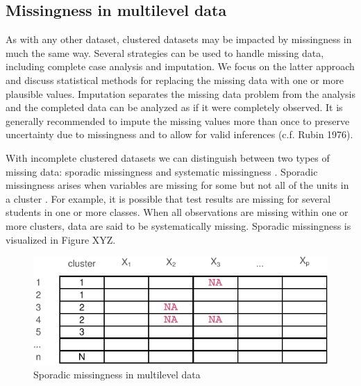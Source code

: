 \documentclass[
]{jss}
\begin{document}
\hypertarget{missingness-in-multilevel-data}{%
\subsection{Missingness in multilevel
data}\label{missingness-in-multilevel-data}}

As with any other dataset, clustered datasets may be impacted by
missingness in much the same way. Several strategies can be used to
handle missing data, including complete case analysis and imputation. We
focus on the latter approach and discuss statistical methods for
replacing the missing data with one or more plausible values. Imputation
separates the missing data problem from the analysis and the completed
data can be analyzed as if it were completely observed. It is generally
recommended to impute the missing values more than once to preserve
uncertainty due to missingness and to allow for valid inferences (c.f.
Rubin 1976).

With incomplete clustered datasets we can distinguish between two types
of missing data: sporadic missingness and systematic missingness
\citep{resc13}. Sporadic missingness arises when variables are missing
for some but not all of the units in a cluster \citep{buur18, jola18}.
For example, it is possible that test results are missing for several
students in one or more classes. When all observations are missing
within one or more clusters, data are said to be systematically missing.
Sporadic missingness is visualized in Figure XYZ.

\begin{CodeChunk}
\begin{figure}

{\centering \includegraphics{Imputation_of_Incomplete_Multilevel_Data_files/figure-latex/patterns-1} 

}

\caption[Sporadic missingness in multilevel data]{Sporadic missingness in multilevel data}\label{fig:patterns}
\end{figure}
\end{CodeChunk}
\end{document}
